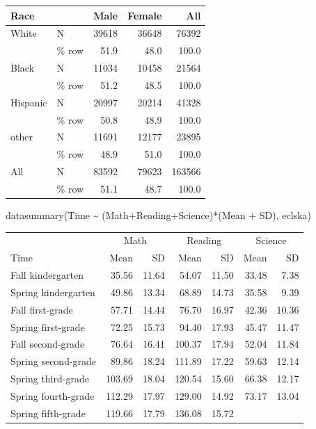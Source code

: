 \documentclass[
]{article}
\newenvironment{Shaded}{\begin{snugshade}}{\end{snugshade}}
\newcommand{\FunctionTok}[1]{\textcolor[rgb]{0.00,0.00,0.00}{#1}}
\newcommand{\NormalTok}[1]{#1}
\newcommand{\SpecialCharTok}[1]{\textcolor[rgb]{0.00,0.00,0.00}{#1}}
\begin{document}
\begin{table}
\centering
\begin{tabular}[t]{llrrr}
\toprule
Race &   & Male & Female & All\\
\midrule
White & N & 39618 & 36648 & 76392\\
 & \% row & 51.9 & 48.0 & 100.0\\
Black & N & 11034 & 10458 & 21564\\
 & \% row & 51.2 & 48.5 & 100.0\\
Hispanic & N & 20997 & 20214 & 41328\\
 & \% row & 50.8 & 48.9 & 100.0\\
other & N & 11691 & 12177 & 23895\\
 & \% row & 48.9 & 51.0 & 100.0\\
All & N & 83592 & 79623 & 163566\\
 & \% row & 51.1 & 48.7 & 100.0\\
\bottomrule
\end{tabular}
\end{table}

\begin{Shaded}
\begin{Highlighting}[]
\FunctionTok{datasummary}\NormalTok{(Time }\SpecialCharTok{\textasciitilde{}}\NormalTok{ (Math}\SpecialCharTok{+}\NormalTok{Reading}\SpecialCharTok{+}\NormalTok{Science)}\SpecialCharTok{*}\NormalTok{(Mean }\SpecialCharTok{+}\NormalTok{ SD), eclska)}
\end{Highlighting}
\end{Shaded}

\begin{table}
\centering
\begin{tabular}[t]{lrrrrrr}
\toprule
\multicolumn{1}{c}{ } & \multicolumn{2}{c}{Math} & \multicolumn{2}{c}{Reading} & \multicolumn{2}{c}{Science} \\
\cmidrule(l{3pt}r{3pt}){2-3} \cmidrule(l{3pt}r{3pt}){4-5} \cmidrule(l{3pt}r{3pt}){6-7}
Time & Mean & SD & Mean  & SD  & Mean   & SD  \\
\midrule
Fall kindergarten & 35.56 & 11.64 & 54.07 & 11.50 & 33.48 & 7.38\\
Spring kindergarten & 49.86 & 13.34 & 68.89 & 14.73 & 35.58 & 9.39\\
Fall first-grade & 57.71 & 14.44 & 76.70 & 16.97 & 42.36 & 10.36\\
Spring first-grade & 72.25 & 15.73 & 94.40 & 17.93 & 45.47 & 11.47\\
Fall second-grade & 76.64 & 16.41 & 100.37 & 17.94 & 52.04 & 11.84\\
Spring second-grade & 89.86 & 18.24 & 111.89 & 17.22 & 59.63 & 12.14\\
Spring third-grade & 103.69 & 18.04 & 120.54 & 15.60 & 66.38 & 12.17\\
Spring fourth-grade & 112.29 & 17.97 & 129.00 & 14.92 & 73.17 & 13.04\\
Spring fifth-grade & 119.66 & 17.79 & 136.08 & 15.72 &  & \\
\bottomrule
\end{tabular}
\end{table}
\end{document}
